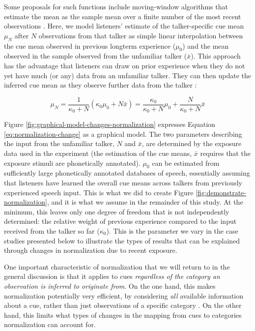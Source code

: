 \documentclass[
  11pt,
  man,floatsintext]{apa6}
\begin{document}
Some proposals for such functions include moving-window algorithms that estimate the mean as the sample mean over a finite number of the most recent observations \autocite{lee2002,zhang-peng2021}. Here, we model listeners' estimate of the talker-specific cue mean \(\mu_N\) after \(N\) observations from that talker as simple linear interpolation between the cue mean observed in previous longterm experience (\(\mu_0\)) and the mean observed in the sample observed from the unfamiliar talker (\(\bar{x}\)). This approach has the advantage that listeners can draw on prior experience when they do not yet have much (or any) data from an unfamiliar talker. They can then update the inferred cue mean as they observe further data from the talker \autocite[see discussion of the flexibility-stability trade-off in][178-182]{kleinschmidt-jaeger2015}:

\begin{equation}\label{eq:normalization-change}
\mu_N = \frac{1}{\kappa_0 + N} \left( \kappa_0 \mu_0 + N \bar{x} \right) = \frac{\kappa_0}{\kappa_0 + N} \mu_0 + \frac{N}{\kappa_0 + N}\bar{x}
\end{equation}

Figure \ref{fig:graphical-model-changes-normalization} expresses Equation \eqref{eq:normalization-change} as a graphical model. The two parameters describing the input from the unfamiliar talker, \(N\) and \(\bar{x}\), are determined by the exposure data used in the experiment (the estimation of the cue means, \(\bar{x}\) requires that the exposure stimuli are phonetically annotated). \(\mu_0\) can be estimated from sufficiently large phonetically annotated databases of speech, essentially assuming that listeners have learned the overall cue means across talkers from previously experienced speech input. This is what we did to create Figure \ref{fig:demonstrate-normalization}, and it is what we assume in the remainder of this study. At the minimum, this leaves only one degree of freedom that is not independently determined: the relative weight of previous experience compared to the input received from the talker so far (\(\kappa_0\)). This is the parameter we vary in the case studies presented below to illustrate the types of results that can be explained through changes in normalization due to recent exposure.

One important characteristic of normalization that we will return to in the general discussion is that it applies to cues \emph{regardless of the category an observation is inferred to originate from}. On the one hand, this makes normalization potentially very efficient, by considering \emph{all} available information about a cue, rather than just observations of a specific category \autocite{apfelbaum-mcmurray2015}. On the other hand, this limits what types of changes in the mapping from cues to categories normalization can account for.
\end{document}
